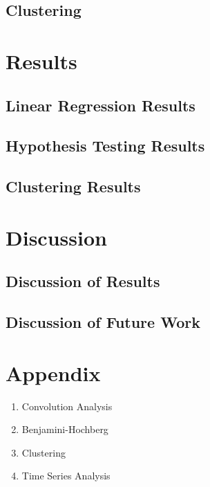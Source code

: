 \documentclass[11pt]{article}
\begin{document}
		

	\subsection{Clustering}
	
		
		
\section{Results}
		
	\subsection{Linear Regression Results}
	
		
				
	\subsection{Hypothesis Testing Results}
	
		
		
	\subsection{Clustering Results}
	
		

\section{Discussion}
	
	\subsection{Discussion of Results}
		
		
		
	\subsection{Discussion of Future Work}
	
		
		



\section{Appendix}

\begin{enumerate}
	\item Convolution Analysis

	\item Benjamini-Hochberg

	\item Clustering

	\item Time Series Analysis

\end{enumerate}
\end{document}
